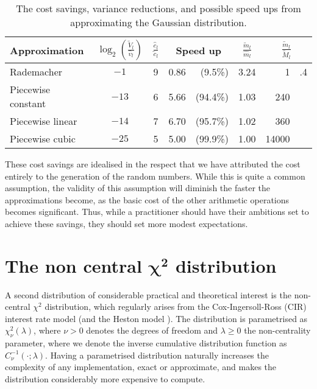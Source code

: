 \documentclass[manuscript,review]{acmart}
\begin{document}
\begin{table}[htb]
\centering
\caption{The cost savings, variance reductions, and possible speed ups from approximating the Gaussian distribution.}
\label{tab:savings}
\begin{tabular}{lcclrcr@{}l}
Approximation  & $ {\log}_2 \left(\tfrac{\widetilde{V}_l}{\hat{v}_l}\right) $ & $ \tfrac{\hat{c}_l}{\tilde{c}_l} $ & \multicolumn{2}{c}{Speed up} & $ \tfrac{\widetilde{m}_l}{\widehat{m}_l} $ & \multicolumn{2}{c}{$ \tfrac{\widetilde{m}_l}{\widetilde{M}_l} $} \\[0.5em]
\hline
Rademacher & $ -1 $ & 9 & 0.86 & (9.5\%) & 3.24 & 1&.4 \\
Piecewise constant & $ -13 $ & 6 & 5.66 & (94.4\%) & 1.03 & 240& \\
Piecewise linear  & $ -14 $ & 7& 6.70 & (95.7\%) & 1.02 & 360 &\\
Piecewise cubic  & $ -25 $ & 5 & 5.00 & (99.9\%)& 1.00 & 14000 & 
\end{tabular}
\end{table}

These cost savings are idealised in the respect that we have attributed the cost entirely to the generation of the random numbers. While this is quite a common assumption, the validity of this assumption will diminish the faster the approximations become, as the basic cost of the other arithmetic operations becomes significant. Thus, while a practitioner should have their ambitions set to achieve these savings, they should set more modest expectations.

\section{The non central \texorpdfstring{$ \bm{\chi^2} $}{chi-squared} distribution}
\label{sec:the_non_central_chi_squared_distribution}

A second distribution of considerable practical and theoretical interest is the non-central $ \chi^2 $ distribution, which regularly arises from the Cox-Ingersoll-Ross (CIR) interest rate model \citep{cox1985theory} (and the Heston model \citep{heston1993closed}). The distribution is parametrised as $ \chi^2_\nu(\lambda) $, where $ \nu > 0 $ denotes the degrees of freedom and $ \lambda \geq 0 $ the non-centrality parameter, where we denote the inverse cumulative distribution function as $ C^{-1}_\nu(\cdot; \lambda) $. Having a parametrised distribution naturally increases the complexity of any implementation, exact or approximate, and makes the distribution considerably more expensive to compute. 
\end{document}
